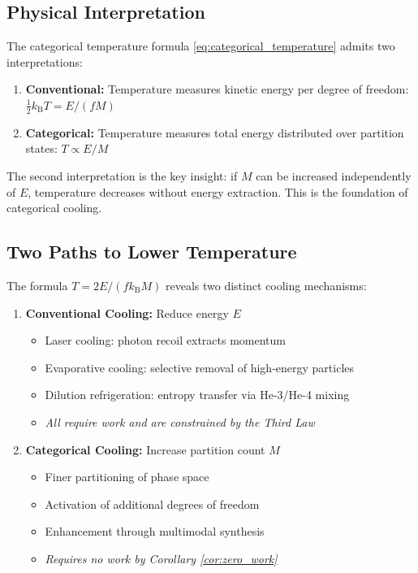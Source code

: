 \documentclass[twocolumn,10pt,twoside]{article}
\newcommand{\kb}{k_{\mathrm{B}}}
\begin{document}
\subsection{Physical Interpretation}

The categorical temperature formula \eqref{eq:categorical_temperature} admits two interpretations:

\begin{enumerate}
    \item \textbf{Conventional:} Temperature measures kinetic energy per degree of freedom: $\frac{1}{2}\kb T = E/(fM)$

    \item \textbf{Categorical:} Temperature measures total energy distributed over partition states: $T \propto E/M$
\end{enumerate}

The second interpretation is the key insight: if $M$ can be increased independently of $E$, temperature decreases without energy extraction. This is the foundation of categorical cooling.

\subsection{Two Paths to Lower Temperature}

The formula $T = 2E/(f\kb M)$ reveals two distinct cooling mechanisms:

\begin{enumerate}
    \item \textbf{Conventional Cooling:} Reduce energy $E$
    \begin{itemize}
        \item Laser cooling: photon recoil extracts momentum
        \item Evaporative cooling: selective removal of high-energy particles
        \item Dilution refrigeration: entropy transfer via He-3/He-4 mixing
        \item \textit{All require work and are constrained by the Third Law}
    \end{itemize}

    \item \textbf{Categorical Cooling:} Increase partition count $M$
    \begin{itemize}
        \item Finer partitioning of phase space
        \item Activation of additional degrees of freedom
        \item Enhancement through multimodal synthesis
        \item \textit{Requires no work by Corollary \ref{cor:zero_work}}
    \end{itemize}
\end{enumerate}
\end{document}
